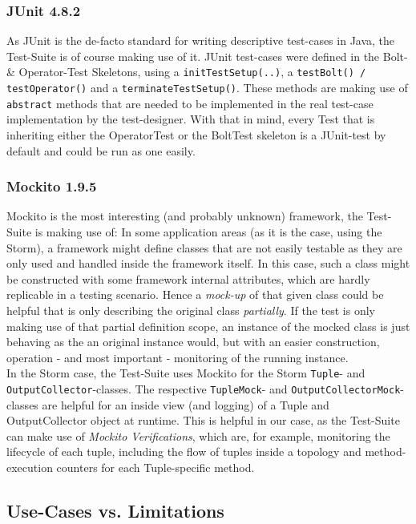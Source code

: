 	\subsubsection{JUnit 4.8.2}
		As JUnit is the de-facto standard for writing descriptive test-cases in Java, the Test-Suite is of course making use of it. JUnit test-cases were defined in the Bolt- \& Operator-Test Skeletons, using a \texttt{initTestSetup(..)}, a \texttt{testBolt() / testOperator()} and a \texttt{terminateTestSetup()}. These methods are making use of \texttt{abstract} methods that are needed to be implemented in the real test-case implementation by the test-designer. With that in mind, every Test that is inheriting either the OperatorTest or the BoltTest skeleton is a JUnit-test by default and could be run as one easily.
	
	\subsubsection{Mockito 1.9.5}
	\label{sect:Mockito}
		Mockito is the most interesting (and probably unknown) framework, the Test-Suite is making use of: In some application areas (as it is the case, using the Storm), a framework might define classes that are not easily testable as they are only used and handled inside the framework itself. In this case, such a class might be constructed with some framework internal attributes, which are hardly replicable in a testing scenario. Hence a \textit{mock-up} of that given class could be helpful that is only describing the original class \textit{partially}. If the test is only making use of that partial definition scope, an instance of the mocked class is just behaving as the an original instance would, but with an easier construction, operation - and most important - monitoring of the running instance.\\
		In the Storm case, the Test-Suite uses Mockito for the Storm \texttt{Tuple}- and \texttt{OutputCollector}-classes. The respective \texttt{TupleMock}- and \texttt{OutputCollectorMock}-classes are helpful for an inside view (and logging) of a Tuple and OutputCollector object at runtime. This is helpful in our case, as the Test-Suite can make use of \textit{Mockito Verifications}, which are, for example, monitoring the lifecycle of each tuple, including the flow of tuples inside a topology and method-execution counters for each Tuple-specific method.
	

\subsection{Use-Cases vs. Limitations}
\label{sect:TestSuiteUseCases}
	
	